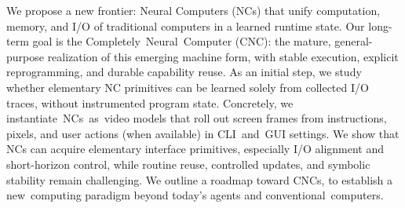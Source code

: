 

We propose a new frontier: Neural Computers (NCs) that unify computation, memory, and I/O of traditional computers in a learned runtime state. 
Our long-term goal is the Completely~Neural~Computer (CNC): the mature, general-purpose realization of this emerging machine form, with stable execution, explicit reprogramming, and durable capability reuse. As an initial step, we study whether elementary NC primitives can be learned solely from collected I/O traces, without instrumented program state. Concretely, we instantiate~NCs~as~video models that roll out screen frames from instructions, pixels, and user actions (when available) in CLI~and~GUI settings. 
We show that NCs
can acquire elementary interface primitives, especially I/O alignment and short-horizon control, while routine reuse, controlled updates, and symbolic stability remain challenging. 
We outline a roadmap toward CNCs, to establish a new~computing paradigm beyond today’s agents and conventional~computers.

